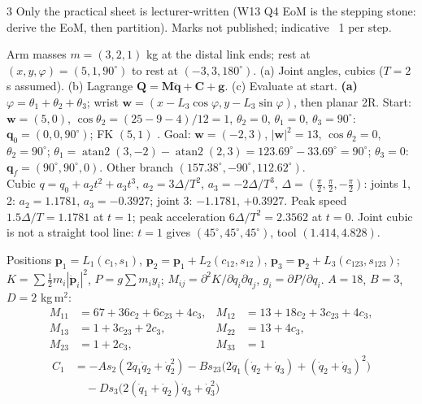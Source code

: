\begin{multicols}{3}
Only the practical sheet is lecturer-written (W13 Q4 EoM is the stepping stone: derive the EoM, then partition). Marks not published; indicative ~1 per step.
\begin{examq}\label{w9:prac}
Arm masses $m=(3,2,1)$ kg at the distal link ends; rest at $(x,y,\varphi)=(5,1,90^\circ)$ to rest at $(-3,3,180^\circ)$. (a) Joint angles, cubics ($T=2$ s assumed). (b) Lagrange $\mathbf Q=\mathbf M\ddot{\mathbf q}+\mathbf C+\mathbf g$. (c) Evaluate at start.
\solution
\textbf{(a)} $\varphi=\theta_1+\theta_2+\theta_3$; wrist $\mathbf w=(x-L_3\cos\varphi,y-L_3\sin\varphi)$, then planar 2R. Start: $\mathbf w=(5,0)$, $\cos\theta_2=(25-9-4)/12=1$, $\theta_2=0$, $\theta_1=0$, $\theta_3=90^\circ$: $\mathbf q_0=(0,0,90^\circ)$; FK $(5,1)$ \checkmark. Goal: $\mathbf w=(-2,3)$, $|\mathbf w|^2=13$, $\cos\theta_2=0$, $\theta_2=90^\circ$; $\theta_1=\operatorname{atan2}(3,-2)-\operatorname{atan2}(2,3)=123.69^\circ-33.69^\circ=90^\circ$; $\theta_3=0$: $\mathbf q_f=(90^\circ,90^\circ,0)$. Other branch $(157.38^\circ,-90^\circ,112.62^\circ)$. \chk\\
Cubic $q=q_0+a_2t^2+a_3t^3$, $a_2=3\Delta/T^2$, $a_3=-2\Delta/T^3$, $\Delta=(\tfrac\pi2,\tfrac\pi2,-\tfrac\pi2)$: joints 1, 2: $a_2=1.1781$, $a_3=-0.3927$; joint 3: $-1.1781$, $+0.3927$. Peak speed $1.5\Delta/T=1.1781$ at $t=1$; peak acceleration $6\Delta/T^2=2.3562$ at $t=0$. Joint cubic is not a straight tool line: $t=1$ gives $(45^\circ,45^\circ,45^\circ)$, tool $(1.414,4.828)$. \chk
\end{examq}
\begin{examq}
Positions $\mathbf p_1=L_1(c_1,s_1)$, $\mathbf p_2=\mathbf p_1+L_2(c_{12},s_{12})$, $\mathbf p_3=\mathbf p_2+L_3(c_{123},s_{123})$; $K=\sum\tfrac12m_i|\dot{\mathbf p}_i|^2$, $P=g\sum m_iy_i$; $M_{ij}=\partial^2K/\partial\dot q_i\partial\dot q_j$, $g_i=\partial P/\partial q_i$. $A=18$, $B=3$, $D=2$ kg\,m$^2$:
\[\begin{aligned}
M_{11}&=67+36c_2+6c_{23}+4c_3, & M_{12}&=13+18c_2+3c_{23}+4c_3,\\
M_{13}&=1+3c_{23}+2c_3, & M_{22}&=13+4c_3,\\
M_{23}&=1+2c_3, & M_{33}&=1
\end{aligned}\]
\[\begin{aligned}
C_1&=-As_2(2\dot q_1\dot q_2+\dot q_2^2)-Bs_{23}\big(2\dot q_1(\dot q_2{+}\dot q_3)+(\dot q_2{+}\dot q_3)^2\big)\\&\quad-Ds_3\big(2(\dot q_1{+}\dot q_2)\dot q_3+\dot q_3^2\big)\\

\end{aligned}\]
\end{examq}
\end{multicols}
